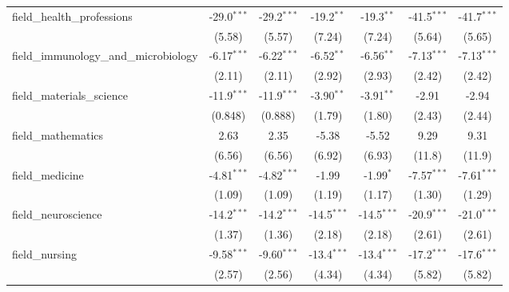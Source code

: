 \begin{tabular}{lcccccc}
   field\_health\_professions                                  & -29.0$^{***}$ & -29.2$^{***}$ & -19.2$^{**}$  & -19.3$^{**}$  & -41.5$^{***}$ & -41.7$^{***}$\\   
                                                               & (5.58)        & (5.57)        & (7.24)        & (7.24)        & (5.64)        & (5.65)\\   
   field\_immunology\_and\_microbiology                        & -6.17$^{***}$ & -6.22$^{***}$ & -6.52$^{**}$  & -6.56$^{**}$  & -7.13$^{***}$ & -7.13$^{***}$\\   
                                                               & (2.11)        & (2.11)        & (2.92)        & (2.93)        & (2.42)        & (2.42)\\   
   field\_materials\_science                                   & -11.9$^{***}$ & -11.9$^{***}$ & -3.90$^{**}$  & -3.91$^{**}$  & -2.91         & -2.94\\   
                                                               & (0.848)       & (0.888)       & (1.79)        & (1.80)        & (2.43)        & (2.44)\\   
   field\_mathematics                                          & 2.63          & 2.35          & -5.38         & -5.52         & 9.29          & 9.31\\   
                                                               & (6.56)        & (6.56)        & (6.92)        & (6.93)        & (11.8)        & (11.9)\\   
   field\_medicine                                             & -4.81$^{***}$ & -4.82$^{***}$ & -1.99         & -1.99$^{*}$   & -7.57$^{***}$ & -7.61$^{***}$\\   
                                                               & (1.09)        & (1.09)        & (1.19)        & (1.17)        & (1.30)        & (1.29)\\   
   field\_neuroscience                                         & -14.2$^{***}$ & -14.2$^{***}$ & -14.5$^{***}$ & -14.5$^{***}$ & -20.9$^{***}$ & -21.0$^{***}$\\   
                                                               & (1.37)        & (1.36)        & (2.18)        & (2.18)        & (2.61)        & (2.61)\\   
   field\_nursing                                              & -9.58$^{***}$ & -9.60$^{***}$ & -13.4$^{***}$ & -13.4$^{***}$ & -17.2$^{***}$ & -17.6$^{***}$\\   
                                                               & (2.57)        & (2.56)        & (4.34)        & (4.34)        & (5.82)        & (5.82)\\   

\end{tabular}
